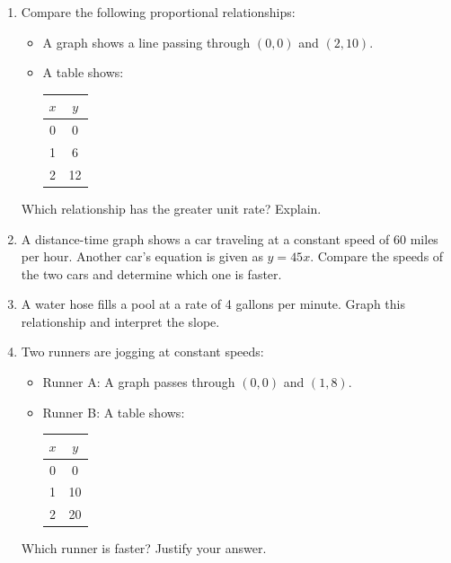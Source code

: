 \documentclass[12pt]{article}
\begin{document}
\begin{tcolorbox}[colframe=black!60, colback=white, 
coltitle=black, colbacktitle=black!15, fonttitle=\bfseries\Large, 
title=Problems, halign title=center, left=10pt, right=10pt, top=10pt, bottom=60pt]
\begin{enumerate}[start=6, itemsep=3em]
    \item Compare the following proportional relationships:
    \begin{itemize}
        \item A graph shows a line passing through \((0, 0)\) and \((2, 10)\).
        \item A table shows:
        \begin{tabular}{|c|c|}
        \hline
        \(x\) & \(y\) \\
        \hline
        0 & 0 \\
        1 & 6 \\
        2 & 12 \\
        \hline
        \end{tabular}
    \end{itemize}
    Which relationship has the greater unit rate? Explain.
    \item A distance-time graph shows a car traveling at a constant speed of 60 miles per hour. Another car's equation is given as \(y = 45x\). Compare the speeds of the two cars and determine which one is faster.
    \item A water hose fills a pool at a rate of 4 gallons per minute. Graph this relationship and interpret the slope.
    \item Two runners are jogging at constant speeds:
    \begin{itemize}
        \item Runner A: A graph passes through \((0, 0)\) and \((1, 8)\).
        \item Runner B: A table shows:
        \begin{tabular}{|c|c|}
        \hline
        \(x\) & \(y\) \\
        \hline
        0 & 0 \\
        1 & 10 \\
        2 & 20 \\
        \hline
        \end{tabular}
    \end{itemize}
    Which runner is faster? Justify your answer.
\end{enumerate}
\end{tcolorbox}
\end{document}
